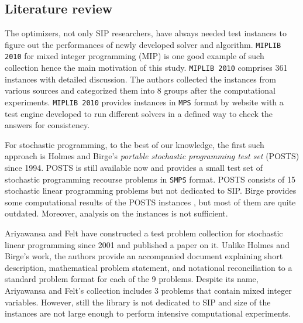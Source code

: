 \subsection{Literature review} \label{subsec:literaturereview}
The optimizers, not only SIP researchers, have always needed test instances to figure out the performances of newly developed solver and algorithm. \texttt{MIPLIB 2010} \cite{MIPLIB} for mixed integer programming (MIP) is one good example of such collection hence the main motivation of this study. \texttt{MIPLIB 2010} comprises 361 instances with detailed discussion. The authors collected the instances from various sources and categorized them into 8 groups after the computational experiments. \texttt{MIPLIB 2010} provides instances in \texttt{MPS} format by website with a test engine developed to run different solvers in a defined way to check the answers for consistency. 

For stochastic programming, to the best of our knowledge, the first such approach is Holmes and Birge's \textit{portable stochastic programming test set} (POSTS) \cite{POSTS} since 1994. POSTS is still available now and provides a small test set of stochastic programming recourse problems in \texttt{SMPS} format. POSTS consists of 15 stochastic linear programming problems but not dedicated to SIP. Birge provides some computational results of the POSTS instances \cite{POSTSresults}, but most of them are quite outdated. Moreover, analysis on the instances is not sufficient. 

Ariyawansa and Felt \cite{AF2004} have constructed a test problem collection for stochastic linear programming since 2001 and published a paper on it. Unlike Holmes and Birge's work, the authors provide an accompanied document explaining short description, mathematical problem statement, and notational reconciliation to a standard problem format for each of the 9 problems. Despite its name, Ariyawansa and Felt's collection includes 3 problems that contain mixed integer variables. However, still the library is not dedicated to SIP and size of the instances are not large enough to perform intensive computational experiments. 

